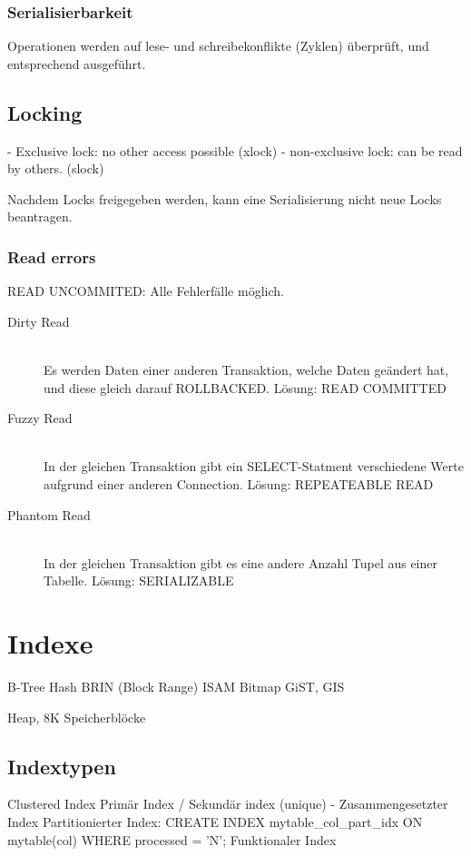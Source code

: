\begin{multicols}{2}
	\subsubsection{Serialisierbarkeit}
	Operationen werden auf lese- und schreibekonflikte (Zyklen) überprüft, und entsprechend ausgeführt.
	
	
	\subsection{Locking}
	
	- Exclusive lock: no other access possible (xlock)
	- non-exclusive lock: can be read by others. (slock)
	
	Nachdem Locks freigegeben werden, kann eine Serialisierung nicht neue Locks beantragen.
	
	
	\subsubsection{Read errors}
		READ UNCOMMITED: Alle Fehlerfälle möglich.
		
		\begin{description}
			\item[Dirty Read] \hfill \\
				Es werden Daten einer anderen Transaktion, welche Daten geändert hat, und diese gleich darauf ROLLBACKED.
				Lösung: READ COMMITTED
			\item[Fuzzy Read] \hfill \\
				In der gleichen Transaktion gibt ein SELECT-Statment verschiedene Werte aufgrund einer anderen Connection.
				Lösung: REPEATEABLE READ
			\item[Phantom Read] \hfill \\
				In der gleichen Transaktion gibt es eine andere Anzahl Tupel aus einer Tabelle.
				Lösung: SERIALIZABLE
		\end{description}
	
\section{Indexe}

B-Tree
Hash
BRIN (Block Range)
ISAM
Bitmap
GiST, GIS

Heap, 8K Speicherblöcke 

\subsection{Indextypen}
Clustered Index
Primär Index / Sekundär index (unique)
- Zusammengesetzter Index
Partitionierter Index: CREATE INDEX mytable_col_part_idx ON mytable(col) WHERE processed = 'N';
Funktionaler Index

\end{multicols}



